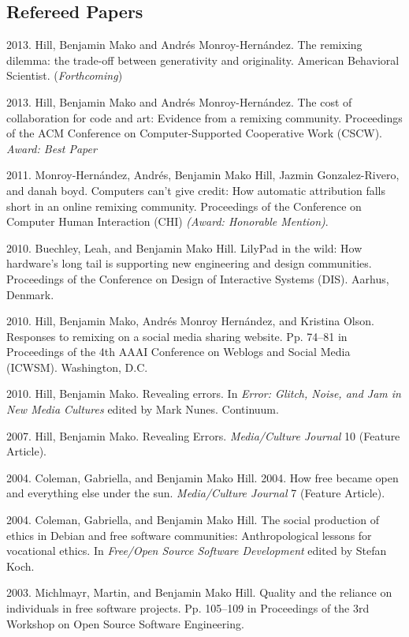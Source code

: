 \documentclass[10pt]{article}
\newenvironment{cvlist}{
\begin{list}{}{\leftmargin=3.0em \itemindent=-3.0em}
  \setlength{\itemsep}{0pt}
  \setlength{\parskip}{0em}
  \setlength{\parsep}{1em}
  \setlength{\parindent}{0em}}
{\vspace{1em}
\end{list}}
\begin{document}
\subsection{Refereed Papers}
\begin{cvlist}
\item 2013. Hill, Benjamin Mako and Andrés Monroy-Hernández.
  The remixing dilemma: the trade-off between generativity and
  originality. American Behavioral Scientist. (\emph{Forthcoming})
\item 2013. Hill, Benjamin Mako and Andrés Monroy-Hernández. The cost
  of collaboration for code and art: Evidence from a remixing
  community.  Proceedings of the ACM Conference on Computer-Supported
  Cooperative Work (CSCW). \emph{Award: Best Paper}
\item 2011. Monroy-Hernández, Andrés, Benjamin Mako Hill, Jazmin
  Gonzalez-Rivero, and danah boyd. Computers can't give credit: How
  automatic attribution falls short in an online remixing
  community. Proceedings of the Conference on Computer Human
  Interaction (CHI) \emph{(Award: Honorable Mention)}.
\item 2010. Buechley, Leah, and Benjamin Mako Hill. LilyPad in the wild:
  How hardware's long tail is supporting new engineering and design
  communities. Proceedings of the Conference on Design of Interactive
  Systems (DIS). Aarhus, Denmark.
\item 2010. Hill, Benjamin Mako, Andrés Monroy Hernández, and Kristina
  Olson. Responses to remixing on a social media sharing
  website. Pp. 74--81 in Proceedings of the 4th AAAI Conference on
  Weblogs and Social Media (ICWSM). Washington, D.C.
\item 2010. Hill, Benjamin Mako. Revealing errors. In \emph{Error:
    Glitch, Noise, and Jam in New Media Cultures} edited by Mark
  Nunes. Continuum. %
\item 2007. Hill, Benjamin Mako. Revealing Errors. \emph{Media/Culture
    Journal} 10 (Feature Article).
\item 2004. Coleman, Gabriella, and Benjamin Mako Hill. 2004. How free
  became open and everything else under the sun. \emph{Media/Culture
    Journal} 7 (Feature Article).
\item 2004. Coleman, Gabriella, and Benjamin Mako Hill. The social
  production of ethics in Debian and free software communities:
  Anthropological lessons for vocational ethics. In \emph{Free/Open
    Source Software Development} edited by Stefan Koch.
\item 2003. Michlmayr, Martin, and Benjamin Mako Hill. Quality and the
  reliance on individuals in free software projects. Pp. 105--109 in
  Proceedings of the 3rd Workshop on Open Source Software Engineering.
\end{cvlist}
\end{document}
